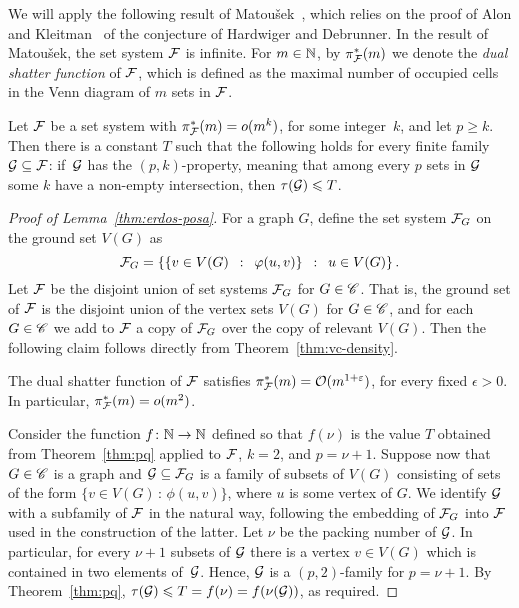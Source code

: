 We will apply the following result of Matou{\v
  s}ek~\cite{Matousek:2004:BVI:1005787.1005789}, which relies on the
proof of Alon and Kleitman~\cite{ALON1992103} of the conjecture of
Hardwiger and Debrunner.  In the result of Matou{\v s}ek, the set
system $\cal F$ is infinite. For $m\in \N$, by $\pi_{\cal F}^*(m)$ we
denote the \emph{dual shatter function} of $\cal F$, which is defined
as the maximal number of occupied cells in the Venn diagram of $m$
sets in $\cal F$.


\begin{theorem}\label{thm:pq}
  Let $\cal F$ be a set system with $\pi^*_{\cal F}(m)=o(m^k)$, for
  some integer~$k$, and let $p\ge k$.  Then there is a constant $T$
  such that the following holds for every finite family
  $\cal G\subset \cal F$: if~$\cal G$ has the $(p,k)$-property,
  meaning that among every $p$ sets in $\cal G$ some $k$ have a
  non-empty intersection, then $\tau ({\cal G})\le T$.
\end{theorem}
\begin{proof}[Proof of Lemma~\ref{thm:erdos-posa}]
For a graph $G$, define the set system ${\cal F}_G$ on the ground set $V(G)$ as
$${\cal F}_G = \setof{\setof{v\in V(G)}{\phi(u, v)}}{u\in V(G)}.$$
Let $\cal F$ be the disjoint union of set systems ${\cal F}_G$ for
$G\in \CCC$. That is, the ground set of $\cal F$ is the disjoint union
of the vertex sets $V(G)$ for $G\in \CCC$, and for each $G\in \CCC$ we
add to ${\cal F}$ a copy of ${\cal F}_G$ over the copy of relevant
$V(G)$.  Then the following claim follows directly from
Theorem~\ref{thm:vc-density}.

\begin{claim}
  The dual shatter function of $\cal F$ satisfies
  $\pi^*_{\cal F}(m)=\Oof(m^{1+\epsilon})$, for every fixed
  $\epsilon>0$. In particular, $\pi^*_{\cal F}(m)=o(m^{2})$.
\end{claim}

Consider the function $f\from \N \to \N$ defined so that $f(\nu)$ is
the value $T$ obtained from Theorem~\ref{thm:pq} applied to $\cal F$,
$k=2$, and $p=\nu+1$.  Suppose now that $G\in \CCC$ is a graph and
$\GGG\subseteq \FFF_G$ is a family of subsets of $V(G)$ consisting of
sets of the form $\{v\in V(G)\,\colon\,\phi(u,v)\}$, where $u$ is some
vertex of $G$.  We identify $\GGG$ with a subfamily of $\FFF$ in the
natural way, following the embedding of $\FFF_G$ into $\FFF$ used in
the construction of the latter.  Let $\nu$ be the packing number of
$\GGG$.  In particular, for every $\nu+1$ subsets of $\GGG$ there is a
vertex $v\in V(G)$ which is contained in two elements of~$\GGG$.
Hence, $\GGG$ is a $(p,2)$-family for $p=\nu+1$.  By
Theorem~\ref{thm:pq}, $\tau(\GGG)\le T=f(\nu)=f(\nu(\GGG))$, as
required.
\end{proof}
